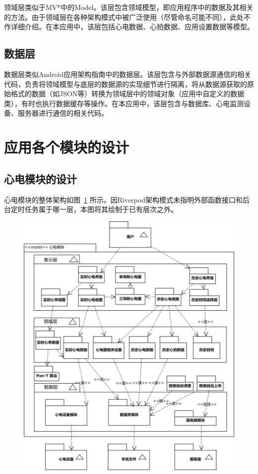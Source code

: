 领域层类似于MV*中的Model。该层包含领域模型，即应用程序中的数据及其相关的方法。由于领域层在各种架构模式中被广泛使用（尽管命名可能不同），此处不作详细介绍。在本应用中，该层包括心电数据、心拍数据、应用设置数据等模型。

\subsection{数据层}\label{subsec:data-layer}

数据层类似Android应用架构指南中的数据层。该层包含与外部数据源通信的相关代码，负责将领域模型与底层的数据源的实现细节进行隔离，将从数据源获取的原始格式的数据（如JSON等）转换为领域层中的领域对象（应用中自定义的数据类），有时也执行数据缓存等操作。在本应用中，该层包含与数据库、心电监测设备、服务器进行通信的相关代码。


\section{应用各个模块的设计}\label{sec:app-design}

\subsection{心电模块的设计}\label{subsec:ecg-design}

心电模块的整体架构如图~\ref{fig:model-ecg} 所示。因Riverpod架构模式未指明外部函数接口和后台定时任务属于哪一层，本图将其绘制于已有层次之外。

\begin{figure}[!ht]
    \includegraphics[width=\textwidth]{../assets/model-ecg.drawio}
    \label{fig:model-ecg}
\end{figure}


